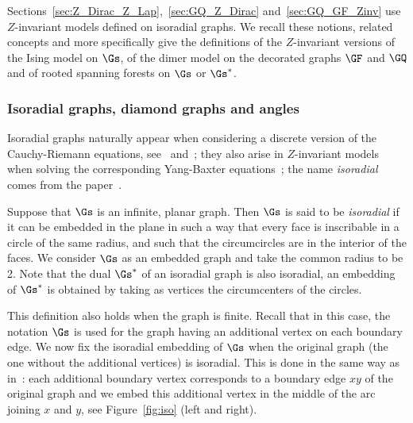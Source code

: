 \documentclass[a4paper,twoside,11pt]{article}
\begin{document}
Sections~\ref{sec:Z_Dirac_Z_Lap},~\ref{sec:GQ_Z_Dirac} and~\ref{sec:GQ_GF_Zinv} use $Z$-invariant models defined on isoradial graphs.
We recall these notions, related concepts and more specifically give the definitions of the $Z$-invariant versions of the Ising model on $\Gs$, of the dimer model
on the decorated graphs $\GF$ and $\GQ$ and of rooted spanning forests on $\Gs$ or $\Gs^*$.


\subsubsection{Isoradial graphs, diamond graphs and angles}

Isoradial graphs naturally appear when considering a discrete version of the Cauchy-Riemann equations, see~\cite{Duffin} 
and~\cite{Mercat:ising,Kenyon3,ChelkakSmirnov:toolbox}; they also arise in $Z$-invariant models when solving the corresponding
Yang-Baxter equations~\cite{Baxter:exactly,CostaSantos}; the name \emph{isoradial} comes from the paper~\cite{Kenyon3}.

Suppose that $\Gs$ is an infinite, planar graph. Then $\Gs$ is said to be \emph{isoradial} if it can be embedded in the plane 
in such a way that every face is inscribable in a circle of the same radius, and such that the circumcircles
are in the interior of the faces. We consider $\Gs$ as an embedded graph and take the common radius to be 
2. Note that the dual $\Gs^*$ of an isoradial graph is also isoradial, an embedding of $\Gs^*$ is 
obtained by taking as vertices the circumcenters of the circles.

This definition also holds when the graph is finite. Recall that in this case, the notation $\Gs$ is used for the graph 
having an additional vertex on each boundary edge. We now fix
the isoradial embedding of $\Gs$ when the original graph (the one without the additional vertices) is isoradial. This is done in the same way as 
in~\cite{ChelkakSmirnov:ising}: each additional boundary vertex corresponds to a boundary edge $xy$ of the original graph
and we embed this additional vertex in the middle of the arc joining $x$ and $y$, see Figure~\ref{fig:iso} (left and right).
\end{document}
